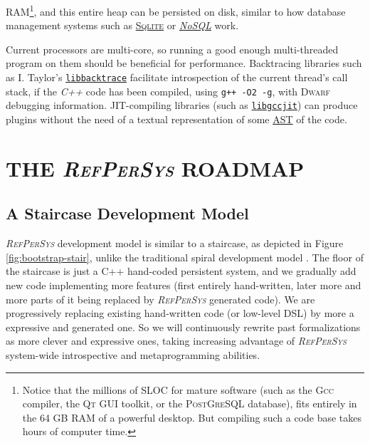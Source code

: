 \documentclass{ecai}
\newcommand{\RefPerSys}{{\textit{\textsc{RefPerSys}}}}
\begin{document}
RAM\footnote{Notice that the millions of SLOC for mature software (such as the
\textsc{Gcc} compiler, the \textsc{Qt} GUI toolkit, or the
\textsc{PostGreSQL} database), fits entirely in the 64 GB RAM of a powerful desktop. 
But compiling such a code base takes hours of computer time.}, and this entire heap
can be persisted on disk, similar to how database management systems
such as \href{http://sqlite.org/}{\textsc{Sqlite}} or \href{https://en.wikipedia.org/wiki/NoSQL}{\textit{NoSQL}} work. 

Current processors are multi-core, so running a good enough multi-threaded program on them
\cite{butenhof:1997:programming} should be beneficial for
performance. Backtracing libraries such as I. Taylor's
\href{https://github.com/ianlancetaylor/libbacktrace}{\texttt{libbacktrace}}
facilitate introspection of the current thread's call stack, if the
\emph{C++} code has been compiled, using \texttt{g++ -O2 -g}, with
\textsc{Dwarf} debugging information. JIT-compiling libraries (such as
\href{https://gcc.gnu.org/onlinedocs/jit/}{\texttt{libgccjit}}) can
produce plugins without the need of a textual representation of some
\href{https://en.wikipedia.org/wiki/Abstract_syntax_tree}{AST} of the
code.



\section{THE {\RefPerSys} ROADMAP}
\label{sec:roadmap}

\subsection{A Staircase Development Model}
\label{subsec:stairecase}

{\RefPerSys} development model is similar to a staircase, as depicted
in Figure \ref{fig:bootstrap-stair}, unlike the traditional spiral development
model \cite{boehm:1988:spiral}. The
floor of the staircase is just a C++ hand-coded persistent
system, and we gradually add new code implementing more features
(first entirely hand-written, later more and more parts of it being replaced
by {\RefPerSys} generated code). We are progressively replacing
existing hand-written code (or low-level DSL) by more a expressive and
generated one. So we will continuously rewrite past formalizations as
more clever and expressive ones, taking increasing advantage of
{\RefPerSys} %
system-wide introspective and metaprogramming abilities.
\end{document}
